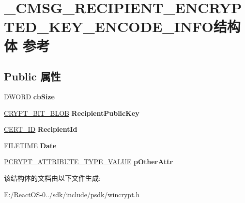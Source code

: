 \hypertarget{struct___c_m_s_g___r_e_c_i_p_i_e_n_t___e_n_c_r_y_p_t_e_d___k_e_y___e_n_c_o_d_e___i_n_f_o}{}\section{\+\_\+\+C\+M\+S\+G\+\_\+\+R\+E\+C\+I\+P\+I\+E\+N\+T\+\_\+\+E\+N\+C\+R\+Y\+P\+T\+E\+D\+\_\+\+K\+E\+Y\+\_\+\+E\+N\+C\+O\+D\+E\+\_\+\+I\+N\+F\+O结构体 参考}
\label{struct___c_m_s_g___r_e_c_i_p_i_e_n_t___e_n_c_r_y_p_t_e_d___k_e_y___e_n_c_o_d_e___i_n_f_o}
\subsection*{Public 属性}
\begin{DoxyCompactItemize}
\item 
\mbox{\label{struct___c_m_s_g___r_e_c_i_p_i_e_n_t___e_n_c_r_y_p_t_e_d___k_e_y___e_n_c_o_d_e___i_n_f_o_a34860e8b994934a3c08045bf1f9edc10}} 
D\+W\+O\+RD {\bfseries cb\+Size}
\item 
\mbox{\label{struct___c_m_s_g___r_e_c_i_p_i_e_n_t___e_n_c_r_y_p_t_e_d___k_e_y___e_n_c_o_d_e___i_n_f_o_a4b900f57086fa4f34f282c9c7deef6cc}} 
\hyperlink{struct___c_r_y_p_t___b_i_t___b_l_o_b}{C\+R\+Y\+P\+T\+\_\+\+B\+I\+T\+\_\+\+B\+L\+OB} {\bfseries Recipient\+Public\+Key}
\item 
\mbox{\label{struct___c_m_s_g___r_e_c_i_p_i_e_n_t___e_n_c_r_y_p_t_e_d___k_e_y___e_n_c_o_d_e___i_n_f_o_a9bc0c695791a1a64df4f062019f38f48}} 
\hyperlink{struct___c_e_r_t___i_d}{C\+E\+R\+T\+\_\+\+ID} {\bfseries Recipient\+Id}
\item 
\mbox{\label{struct___c_m_s_g___r_e_c_i_p_i_e_n_t___e_n_c_r_y_p_t_e_d___k_e_y___e_n_c_o_d_e___i_n_f_o_a2fc8cf24c5d430b78fd7a2a3678ea1dd}} 
\hyperlink{struct___f_i_l_e_t_i_m_e}{F\+I\+L\+E\+T\+I\+ME} {\bfseries Date}
\item 
\mbox{\label{struct___c_m_s_g___r_e_c_i_p_i_e_n_t___e_n_c_r_y_p_t_e_d___k_e_y___e_n_c_o_d_e___i_n_f_o_aebf5f793510b63ab121c3fa9566f78b2}} 
\hyperlink{struct___c_r_y_p_t___a_t_t_r_i_b_u_t_e___t_y_p_e___v_a_l_u_e}{P\+C\+R\+Y\+P\+T\+\_\+\+A\+T\+T\+R\+I\+B\+U\+T\+E\+\_\+\+T\+Y\+P\+E\+\_\+\+V\+A\+L\+UE} {\bfseries p\+Other\+Attr}
\end{DoxyCompactItemize}


该结构体的文档由以下文件生成\+:\begin{DoxyCompactItemize}
\item 
E\+:/\+React\+O\+S-\/0../sdk/include/psdk/wincrypt.\+h\end{DoxyCompactItemize}
